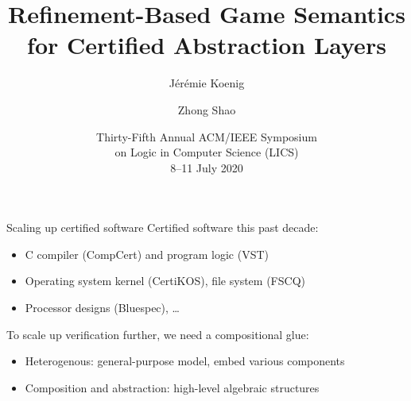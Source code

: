 \documentclass{beamer}
\title[Refinement-Based Game Semantics]%
  {Refinement-Based Game Semantics \\ for Certified Abstraction Layers}
\author{J\'er\'emie Koenig \and Zhong Shao}
\institute[]{Yale University}
\date[LICS'2020]{%
  Thirty-Fifth Annual ACM/IEEE Symposium \\
  on Logic in Computer Science (LICS) \\
  8–11 July 2020}
\begin{document}
\begin{frame}
\titlepage
\end{frame}


\begin{frame}{Scaling up certified software} %
  Certified software this past decade:
  \begin{itemize}
    \item C compiler (CompCert) and program logic (VST)
    \item Operating system kernel (CertiKOS), file system (FSCQ)
    \item Processor designs (Bluespec), \ldots
  \end{itemize}

  \pause
  To scale up verification further, we need a compositional glue:
  \begin{itemize}
    \item Heterogenous: general-purpose model, embed various components
    \item Composition and abstraction: high-level algebraic structures
  \end{itemize}
\end{frame}
\end{document}
